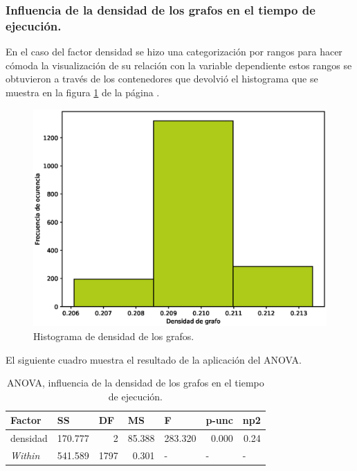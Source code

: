 \documentclass{article}
\begin{document}
\subsubsection{Influencia de la densidad de los grafos en el tiempo de ejecución.}

En el caso del factor densidad se hizo una categorización por rangos para hacer cómoda la visualización de su relación con la variable dependiente estos rangos se obtuvieron a través de los contenedores que devolvió el histograma que se muestra en la figura \ref{fig3} de la página \pageref{fig3}.

\begin{center}
\begin{figure}[ht]
\includegraphics[scale=0.5]{boxplot.eps}
\caption{Histograma de densidad de los grafos.}
\label{fig3}
\end{figure}
\end{center}
El siguiente cuadro muestra el resultado de la aplicación del ANOVA.
\begin{table}[htbp]
  \centering
  \caption{ANOVA, influencia de la densidad de los grafos en el tiempo de ejecución.}
    \begin{tabular}{lrrrlll}
    \toprule
    \textbf{Factor} & \multicolumn{1}{l}{\textbf{SS}} & \multicolumn{1}{l}{\textbf{DF}} & \multicolumn{1}{l}{\textbf{MS}} & \textbf{F} & \textbf{p-unc} & \textbf{np2} \\
    \midrule
    densidad & 170.777 & 2     & 85.388 & \multicolumn{1}{r}{283.320} & \multicolumn{1}{r}{0.000} & \multicolumn{1}{r}{0.24} \\
    \textit{Within} & 541.589 & 1797  & 0.301 & -     & -     & - \\
    \bottomrule
    \end{tabular}%
  \label{tab:t6}%
\end{table}%
\end{document}
